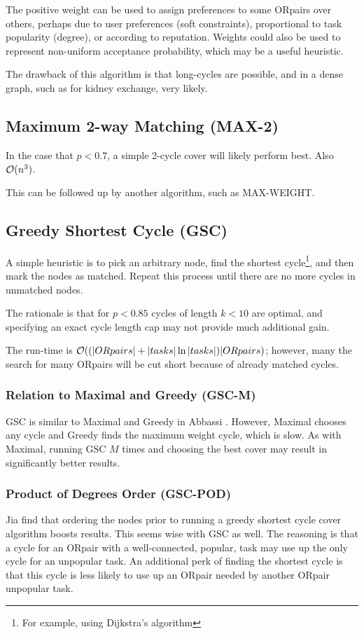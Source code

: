 \documentclass[main.tex]{subfiles}
\begin{document}
The positive weight can be used to assign preferences to some ORpairs over others, perhaps due to user preferences (soft constraints), proportional to task popularity (degree), or according to reputation. Weights could also be used to represent non-uniform acceptance probability, which may be a useful heuristic.

The drawback of this algorithm is that long-cycles are possible, and in a dense graph, such as for kidney exchange, very likely.

\subsection{Maximum 2-way Matching (MAX-2)}
In the case that $p < 0.7$, a simple 2-cycle cover will likely perform best. Also $\mathcal{O}(n^3)$.

This can be followed up by another algorithm, such as MAX-WEIGHT.

\subsection{Greedy Shortest Cycle (GSC)}\label{sec:gsc}
A simple heuristic is to pick an arbitrary node, find the shortest cycle\footnote{For example, using Dijkstra's algorithm}, and then mark the nodes as matched. Repeat this process until there are no more cycles in unmatched nodes.

The rationale is that for $p < 0.85$ cycles of length $k < 10$ are optimal, and specifying an exact cycle length cap may not provide much additional gain.

The run-time is $\mathcal{O}((|ORpairs| + |tasks|\ln|tasks|)|ORpairs)$; however, many the search for many ORpairs will be cut short because of already matched cycles.

\subsubsection{Relation to Maximal and Greedy (GSC-M)}
GSC is similar to Maximal and Greedy in Abbassi \cite{Abb1}. However, Maximal chooses any cycle and Greedy finds the maximum weight cycle, which is slow. As with Maximal, running GSC $M$ times and choosing the best cover may result in significantly better results.

\subsubsection{Product of Degrees Order (GSC-POD)}
Jia \cite{Jia1} find that ordering the nodes prior to running a greedy shortest cycle cover algorithm boosts results. This seems wise with GSC as well. The reasoning is that a cycle for an ORpair with a well-connected, popular, task may use up the only cycle for an unpopular task. An additional perk of finding the shortest cycle is that this cycle is less likely to use up an ORpair needed by another ORpair unpopular task.
\end{document}
